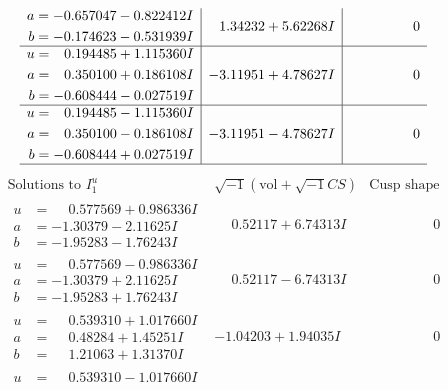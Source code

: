 \documentclass[1p]{elsarticle_modified}
\theoremstyle{definition}
\newcommand{\I}{\sqrt{-1}}
\begin{document}
$$\begin{array}{c|c|c}
\begin{aligned}
a &= -0.657047 - 0.822412 I \\
b &= -0.174623 - 0.531939 I\end{aligned}
 & \phantom{-}1.34232 + 5.62268 I & \phantom{-0.000000 } 0 \\ \hline\begin{aligned}
u &= \phantom{-}0.194485 + 1.115360 I \\
a &= \phantom{-}0.350100 + 0.186108 I \\
b &= -0.608444 - 0.027519 I\end{aligned}
 & -3.11951 + 4.78627 I & \phantom{-0.000000 } 0 \\ \hline\begin{aligned}
u &= \phantom{-}0.194485 - 1.115360 I \\
a &= \phantom{-}0.350100 - 0.186108 I \\
b &= -0.608444 + 0.027519 I\end{aligned}
 & -3.11951 - 4.78627 I & \phantom{-0.000000 } 0\\
 \hline 
 \end{array}$$\newpage$$\begin{array}{c|c|c}  
\text{Solutions to }I^u_{1}& \I (\text{vol} + \sqrt{-1}CS) & \text{Cusp shape}\\
 \hline 
\begin{aligned}
u &= \phantom{-}0.577569 + 0.986336 I \\
a &= -1.30379 - 2.11625 I \\
b &= -1.95283 - 1.76243 I\end{aligned}
 & \phantom{-}0.52117 + 6.74313 I & \phantom{-0.000000 } 0 \\ \hline\begin{aligned}
u &= \phantom{-}0.577569 - 0.986336 I \\
a &= -1.30379 + 2.11625 I \\
b &= -1.95283 + 1.76243 I\end{aligned}
 & \phantom{-}0.52117 - 6.74313 I & \phantom{-0.000000 } 0 \\ \hline\begin{aligned}
u &= \phantom{-}0.539310 + 1.017660 I \\
a &= \phantom{-}0.48284 + 1.45251 I \\
b &= \phantom{-}1.21063 + 1.31370 I\end{aligned}
 & -1.04203 + 1.94035 I & \phantom{-0.000000 } 0 \\ \hline\begin{aligned}
u &= \phantom{-}0.539310 - 1.017660 I \\

\end{aligned}
\end{array}$$
\end{document}
